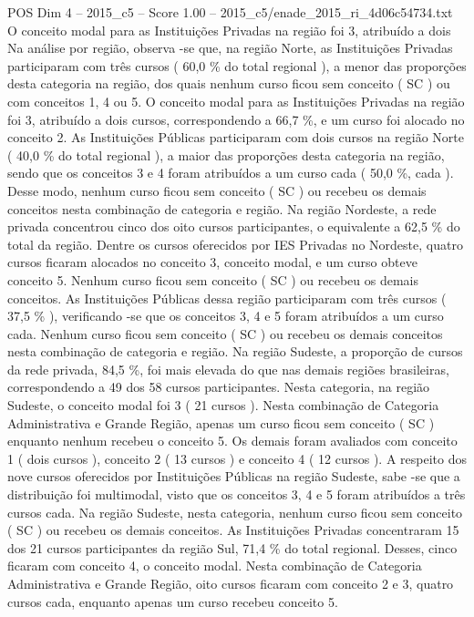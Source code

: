 \begin{textsample}{POS Dim 4 – 2015\_c5 – Score 1.00 – 2015\_c5/enade\_2015\_ri\_4d06c54734.txt}
O conceito modal para as Instituições Privadas na região foi 3, atribuído a dois Na análise por região, observa -se que, na região Norte, as Instituições Privadas participaram com três cursos ( 60,0 \% do total regional ), a menor das proporções desta categoria na região, dos quais nenhum curso ficou sem conceito ( SC ) ou com conceitos 1, 4 ou 5.
O conceito modal para as Instituições Privadas na região foi 3, atribuído a dois cursos, correspondendo a 66,7 \%, e um curso foi alocado no conceito 2.
As Instituições Públicas participaram com dois cursos na região Norte ( 40,0 \% do total regional ), a maior das proporções desta categoria na região, sendo que os conceitos 3 e 4 foram atribuídos a um curso cada ( 50,0 \%, cada ).
Desse modo, nenhum curso ficou sem conceito ( SC ) ou recebeu os demais conceitos nesta combinação de categoria e região.
Na região Nordeste, a rede privada concentrou cinco dos oito cursos participantes, o equivalente a 62,5 \% do total da região.
Dentre os cursos oferecidos por IES Privadas no Nordeste, quatro cursos ficaram alocados no conceito 3, conceito modal, e um curso obteve conceito 5.
Nenhum curso ficou sem conceito ( SC ) ou recebeu os demais conceitos.
As Instituições Públicas dessa região participaram com três cursos ( 37,5 \% ), verificando -se que os conceitos 3, 4 e 5 foram atribuídos a um curso cada.
Nenhum curso ficou sem conceito ( SC ) ou recebeu os demais conceitos nesta combinação de categoria e região.
Na região Sudeste, a proporção de cursos da rede privada, 84,5 \%, foi mais elevada do que nas demais regiões brasileiras, correspondendo a 49 dos 58 cursos participantes.
Nesta categoria, na região Sudeste, o conceito modal foi 3 ( 21 cursos ).
Nesta combinação de Categoria Administrativa e Grande Região, apenas um curso ficou sem conceito ( SC ) enquanto nenhum recebeu o conceito 5.
Os demais foram avaliados com conceito 1 ( dois cursos ), conceito 2 ( 13 cursos ) e conceito 4 ( 12 cursos ).
A respeito dos nove cursos oferecidos por Instituições Públicas na região Sudeste, sabe -se que a distribuição foi multimodal, visto que os conceitos 3, 4 e 5 foram atribuídos a três cursos cada.
Na região Sudeste, nesta categoria, nenhum curso ficou sem conceito ( SC ) ou recebeu os demais conceitos.
As Instituições Privadas concentraram 15 dos 21 cursos participantes da região Sul, 71,4 \% do total regional.
Desses, cinco ficaram com conceito 4, o conceito modal.
Nesta combinação de Categoria Administrativa e Grande Região, oito cursos ficaram com conceito 2 e 3, quatro cursos cada, enquanto apenas um curso recebeu conceito 5.

\end{textsample}
